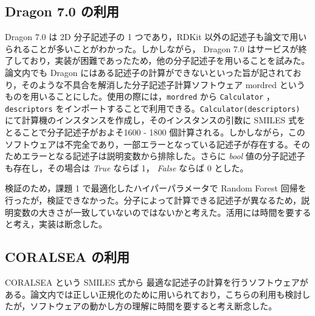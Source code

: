 \documentclass[a4j,11pt]{jarticle}
\begin{document}
\subsection{Dragon 7.0 の利用}
Dragon 7.0 は 2D 分子記述子の 1 つであり，RDKit 以外の記述子も論文で用いられることが多いことがわかった。しかしながら， Dragon 7.0 はサービスが終了しており，実装が困難であったため，他の分子記述子を用いることを試みた。 論文内でも Dragon にはある記述子の計算ができないといった旨が記されており，そのような不具合を解消した分子記述子計算ソフトウェア mordred \cite{mordred}というものを用いることにした。使用の際には，\texttt{mordred} から \texttt{Calculator} ， \texttt{descriptors} をインポートすることで利用できる。\texttt{Calculator(descriptors)} にて計算機のインスタンスを作成し，そのインスタンスの引数に SMILES 式をとることで分子記述子がおよそ1600 - 1800 個計算される。しかしながら，このソフトウェアは不完全であり，一部エラーとなっている記述子が存在する。そのためエラーとなる記述子は説明変数から排除した。さらに \textit{bool} 値の分子記述子も存在し，その場合は \textit{True} ならば 1， \textit{False} ならば 0 とした。\par
検証のため，課題 1 で最適化したハイパーパラメータで Random Forest 回帰を行ったが，検証できなかった。分子によって計算できる記述子が異なるため，説明変数の大きさが一致していないのではないかと考えた。活用には時間を要すると考え，実装は断念した。

\subsection{CORALSEA の利用}
CORALSEA という SMILES 式から 最適な記述子の計算を行うソフトウェアがある。論文内では正しい正規化のために用いられており，こちらの利用も検討したが，ソフトウェアの動かし方の理解に時間を要すると考え断念した。
\end{document}
